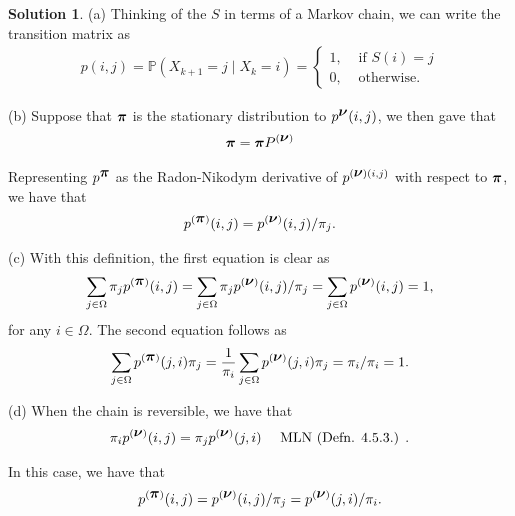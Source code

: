 \documentclass[12pt]{article}
\newcommand{\Prob}{\mathbb{P}}
\theoremstyle{definition}
\newtheorem{sol}{Solution}
\theoremstyle{remark}
\def\vnu{\mbox{\boldmath$\nu$}}
\def\vpi{\mbox{\boldmath$\pi$}}
\begin{document}
\begin{sol}

    (a) Thinking of the $S$ in terms of a Markov chain, we can write the transition matrix as
    \begin{align*}
        p(i,j) = \Prob( X_{k+1} = j \mid X_{k} = i ) 
        =
        \begin{cases}
            1, &\text{ if } S(i) = j\\
            0, &\text{ otherwise.}
        \end{cases}
    \end{align*}

    (b) 
    Suppose that $\vpi$ is the stationary distribution to $p^{\vnu}(i,j)$, we then gave that
    \begin{align*}
        \vpi = \vpi P^{(\vnu)}
    \end{align*}

    Representing $p^{\vpi}$ as the Radon-Nikodym derivative of $p^{(\vnu)(i,j)}$ with respect to $\vpi$, we have that
    \begin{align*}
        p^{(\vpi)}(i, j) = p^{(\vnu)}(i, j) / \pi_{j}.
    \end{align*}

    (c) With this definition, the first equation is clear as 
    \begin{align*}
     \sum_{j\in \Omega} \pi_{j}   p^{(\vpi)}(i, j) =  \sum_{j\in \Omega} \pi_{j}   p^{(\vnu)}(i, j) / \pi_{j}  =  \sum_{j\in \Omega}   p^{(\vnu)}(i, j) =  1,
    \end{align*}
    for any $i \in \Omega$. The second equation follows as
    \begin{align*}
        \sum_{j\in \Omega} p^{(\vpi)}(j, i) \pi_{j} = \frac{1}{\pi_{i}} \sum_{j\in \Omega} p^{(\vnu)}(j, i) \pi_{j} = \pi_{i} / \pi_{i} = 1.
    \end{align*}

    (d) When the chain is reversible, we have that 
    \begin{align*}
        \pi_{i} p^{(\vnu)}(i,j) = \pi_{j} p^{(\vnu)}(j,i) \quad \text{ MLN (Defn. 4.5.3.) }.
    \end{align*}

    In this case, we have that
    \begin{align*}
            p^{(\vpi)}(i, j) = p^{(\vnu)}(i, j) / \pi_{j} = p^{(\vnu)}(j,i) / \pi_{i}.
    \end{align*}


\end{sol}
\end{document}
